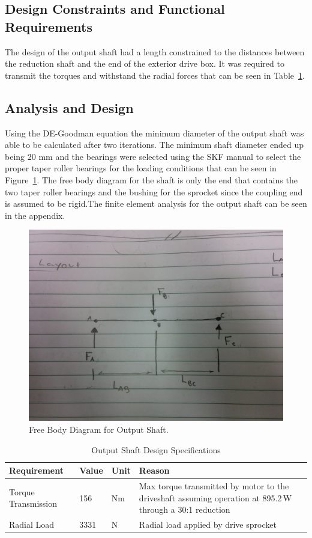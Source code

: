 \subsection{Design Constraints and Functional Requirements}
The design of the output shaft had a length constrained to the distances between the reduction shaft and the end of the exterior drive box. It was required to transmit the torques and withstand the radial forces that can be seen in Table~\ref{tab:output_shaft_specs}.   

\subsection{Analysis and Design}
Using the DE-Goodman equation the minimum diameter of the output shaft was able to be calculated after two iterations. The minimum shaft diameter ended up being 20 mm and the bearings were selected using the SKF manual to select the proper taper roller bearings for the loading conditions that can be seen in Figure~\ref{fig:fb_output_shaft}. The free body diagram for the shaft is only the end that contains the two taper roller bearings and the bushing for the sprocket since the coupling end is assumed to be rigid.The finite element analysis for the output shaft can be seen in the appendix.
\begin{figure}[H]
	\includegraphics[width=\linewidth]{images/fb_output_shaft.jpg}
	\caption{Free Body Diagram for Output Shaft.}
	\label{fig:fb_output_shaft}
\end{figure}
\begin{table}[H]
	\centering
	\caption{Output Shaft Design Specifications}
	\begin{tabular}{| p{5cm}llp{7cm} |} \hline
		Requirement & Value & Unit & Reason \\ \hline
		Torque Transmission & 156 & Nm & Max torque transmitted by motor to the driveshaft assuming operation at 895.2\,W through a 30:1 reduction \\
		Radial Load & 3331	& N & Radial load applied by drive sprocket \\ \hline
	\end{tabular}
	\label{tab:output_shaft_specs}
\end{table}

